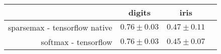 \begin{tabular}{r|ccc}
& digits & iris \\
\hline
sparsemax - tensorflow native & $0.76 \pm 0.03$ & $0.47 \pm 0.11$ \\
softmax - tensorflow & $0.76 \pm 0.03$ & $0.45 \pm 0.07$ \\
\end{tabular}

